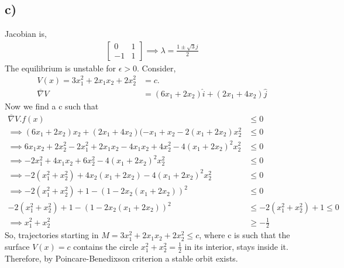 \documentclass{article}
\begin{document}
\subsection*{c)}
Jacobian is,
\begin{align*}
    \begin{bmatrix} 0 & 1 \\ -1 & 1 \end{bmatrix}
    \implies \lambda = \frac{1 \pm \sqrt{3}j}{2}
\end{align*}
The equilibrium is unstable for $\epsilon > 0$. Consider,
\begin{align}
    V(x) = 3x_1^2 + 2x_1x_2 + 2x_2^2 &= c. \\
    \overline{\nabla}V &= (6x_1 + 2x_2)\hat{i} + (2x_1 + 4x_2)\hat{j}
\end{align}
Now we find a c such that
\begin{align*}
    \overline{\nabla}V.f(x) &\leq 0 \\
    \implies (6x_1 + 2x_2)x_2 + (2x_1 + 4x_2)(-x_1 + x_2 - 2(x_1 + 2x_2)x_2^2 &\leq 0 \\
    \implies 6x_1x_2 + 2x_2^2 - 2x_1^2 + 2x_1x_2 - 4x_1x_2 + 4x_2^2 - 4(x_1 + 2x_2)^2x_2^2 &\leq 0 \\
    \implies - 2x_1^2 + 4x_1x_2 + 6x_2^2 - 4(x_1 + 2x_2)^2x_2^2 &\leq 0 \\
    \implies -2(x_1^2 + x_2^2) + 4x_2(x_1 + 2x_2) - 4(x_1 + 2x_2)^2x_2^2 &\leq 0 \\
    \implies -2(x_1^2 + x_2^2) + 1 - (1 - 2x_2(x_1 + 2x_2))^2 &\leq 0 \\
    -2(x_1^2 + x_2^2) + 1 - (1 - 2x_2(x_1 + 2x_2))^2 &\leq -2(x_1^2 + x_2^2) + 1 \leq 0 \\
    \implies x_1^2 + x_2^2 &\geq -\frac{1}{2}
\end{align*}
So, trajectories starting in $M = {3x_1^2 + 2x_1x_2 + 2x_2^2 \leq c}$, where c is such that the surface $V(x) = c$ contains the circle $x_1^2 + x_2^2 = \frac{1}{2}$ in its interior, stays inside it. Therefore, by Poincare-Benedixson criterion a stable orbit exists.
\end{document}
